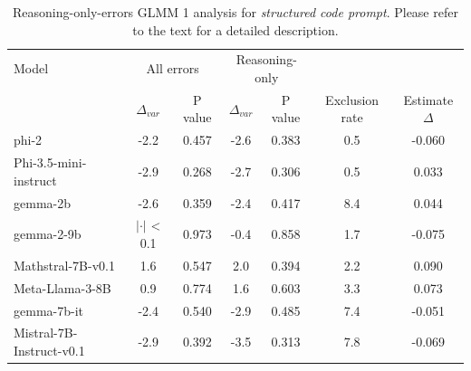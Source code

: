 \documentclass[11pt]{article}
\begin{document}
\begin{table}[H]
\small
\centering
\begin{tabular}{l|cc|cc|cc}
\toprule
Model & \multicolumn{2}{c}{All errors} & \multicolumn{2}{c}{Reasoning-only} & \multicolumn{2}{c}{} \\
 & $\Delta_{var}$ & P value & $\Delta_{var}$ & P value & Exclusion rate & Estimate $\Delta$ \\
\midrule
phi-2 & -2.2 & 0.457 & -2.6 & 0.383 & 0.5 & -0.060 \\
Phi-3.5-mini-instruct & -2.9 & 0.268 & -2.7 & 0.306 & 0.5 & 0.033 \\
gemma-2b & -2.6 & 0.359 & -2.4 & 0.417 & 8.4 & 0.044 \\
gemma-2-9b & $|\cdot|$ < 0.1 & 0.973 & -0.4 & 0.858 & 1.7 & -0.075 \\
Mathstral-7B-v0.1 & 1.6 & 0.547 & 2.0 & 0.394 & 2.2 & 0.090 \\
Meta-Llama-3-8B & 0.9 & 0.774 & 1.6 & 0.603 & 3.3 & 0.073 \\
gemma-7b-it & -2.4 & 0.540 & -2.9 & 0.485 & 7.4 & -0.051 \\
Mistral-7B-Instruct-v0.1 & -2.9 & 0.392 & -3.5 & 0.313 & 7.8 & -0.069 \\
\bottomrule
\end{tabular}
\caption{Reasoning-only-errors GLMM 1 analysis for \textit{structured code prompt}. Please refer to the text for a detailed description.}
\label{tab:clean-glmm1-long-code}
\end{table}
\end{document}
